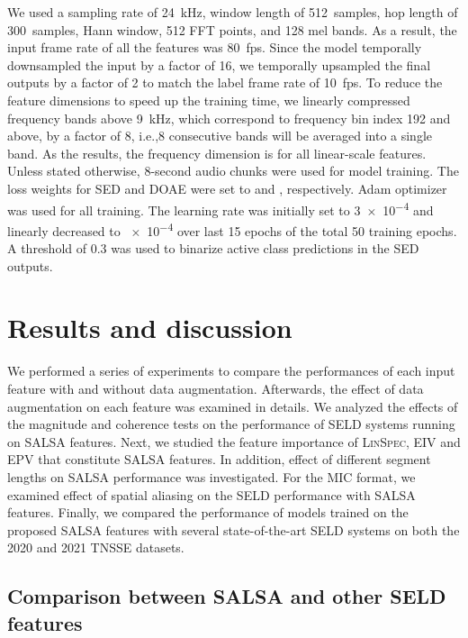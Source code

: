 \documentclass[journal]{IEEEtran}
\newcommand*{\ie}{i.e.,\xspace}
\begin{document}
We used a sampling rate of \SI{24}{\kilo\hertz}, window length of \SI{512}{ samples}, hop length of \SI{300}{samples}, Hann window, \num{512} FFT points, and \num{128} mel bands. As a result, the input frame rate of all the features was \SI{80}{fps}. Since the model temporally downsampled the input by a factor of \num{16}, we temporally upsampled the final outputs by a factor of \num{2} to match the label frame rate of \SI{10}{fps}. To reduce the feature dimensions to speed up the training time, we linearly compressed frequency bands above \SI{9}{\kilo\hertz}, which correspond to frequency bin index \num{192} and above, by a factor of \num{8}, \ie \num{8} consecutive bands will be averaged into a single band. As the results, the frequency dimension is  for all linear-scale features. Unless stated otherwise, \num{8}-second audio chunks were used for model training. The loss weights for SED and DOAE were set to  and , respectively. Adam optimizer was used for all training. The learning rate was initially set to \num{3e-4} and linearly decreased to \num{e-4} over last \num{15} epochs of the total \num{50} training epochs. A threshold of \num{0.3} was used to binarize active class predictions in the SED outputs.  \section{Results and discussion}
\label{sec:results}

We performed a series of experiments to compare the performances of each input feature with and without data augmentation. Afterwards, the effect of data augmentation on each feature was examined in details. We analyzed the effects of the magnitude and coherence tests on the performance of SELD systems running on SALSA features. Next, we studied the feature importance of \textsc{LinSpec}, EIV and EPV that constitute SALSA features. In addition, effect of different segment lengths on SALSA performance was investigated. For the MIC format, we examined effect of spatial aliasing on the SELD performance with SALSA features. Finally, we compared the performance of models trained on the proposed SALSA features with several state-of-the-art SELD systems on both the 2020 and 2021 TNSSE datasets. 

\subsection{Comparison between SALSA and other SELD features}
\end{document}
